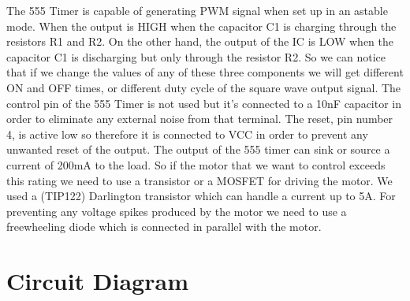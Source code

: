 \documentclass{article}
\begin{document}
The 555 Timer is capable of generating PWM signal when set up in an astable mode.
When the output is HIGH when the capacitor C1 is charging through the resistors R1 and R2.
On the other hand, the output of the IC is LOW when the capacitor C1 is discharging but only through the resistor R2.
So we can notice that if we change the values of any of these three components we will get different ON and OFF times, or different duty cycle of the square wave output signal.
The control pin of the 555 Timer is not used but it’s connected to a 10nF capacitor in order to eliminate any external noise from that terminal. The reset, pin number 4, is active low so therefore it is connected to VCC in order to prevent any unwanted reset of the output.
The output of the 555 timer can sink or source a current of 200mA to the load. So if the motor that we want to control exceeds this rating we need to use a transistor or a MOSFET for driving the motor. We used a (TIP122) Darlington transistor which can handle a current up to 5A.
For preventing any voltage spikes produced by the motor we need to use a freewheeling diode which is connected in parallel with the motor.

\section{Circuit Diagram}
\vspace{5px}
\begin{center}
\end{center}
\vspace{20px}
\end{document}
